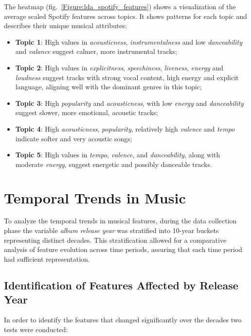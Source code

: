 The heatmap (fig.~\ref{Figure:lda_spotify_features}) shows a visualization of
the average scaled Spotify features across topics. It shows patterns for each
topic and describes their unique musical attributes:

\begin{itemize}
  \item \textbf{Topic 1}: High values in \textit{acousticness},
    \textit{instrumentalness} and low \textit{danceability} and
    \textit{valance} suggest calmer, more instrumental tracks;
  \item \textbf{Topic 2}: High values in \textit{explicitness},
    \textit{speechiness}, \textit{liveness}, \textit{energy} and
    \textit{loudness} suggest tracks with strong vocal content, high energy
    and explicit language, aligning well with the dominant genres in this
    topic;
  \item \textbf{Topic 3}: High \textit{popularity} and \textit{acousticness},
    with low \textit{energy} and  \textit{danceability} suggest slower,
    more emotional, acoustic tracks;
  \item \textbf{Topic 4}: High \textit{acousticness},  \textit{popularity},
    relatively high \textit{valence} and \textit{tempo} indicate softer and
    very acoustic songs;
  \item \textbf{Topic 5}: High values in \textit{tempo}, \textit{valence}, and
    \textit{danceability}, along with moderate \textit{energy}, suggest
    energetic and possibly danceable tracks.
\end{itemize}

\clearpage
\section{Temporal Trends in Music}
\label{sec:temporaltrends}

To analyze the temporal trends in musical features, during the data collection
phase the variable \textit{album release year} was stratified into 10-year
buckets representing distinct decades. This stratification allowed for a
comparative analysis of feature evolution across time periods, assuring
that each time period had sufficient representation.


\subsection{Identification of Features Affected by Release Year}

In order to identify the features that changed significantly over the decades
two tests were conducted:


